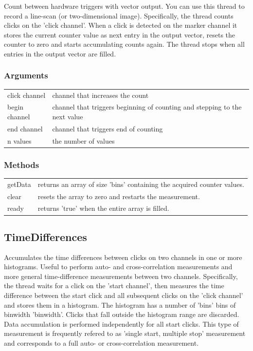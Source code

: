 \documentclass[oneside]{memoir}
\begin{document}
Count between hardware triggers with vector output. You can use this thread to record a line-scan (or
two-dimensional image). Specifically, the thread counts clicks on the 'click channel'. When a click
is detected on the marker channel it stores the current counter value as next entry in the output vector,
resets the counter to zero and starts accumulating counts again. The thread stops when all
entries in the output vector are filled.
\subsubsection{Arguments}
\begin{tabular}{p{}p{}}
  click channel & channel that increases the count\\
  begin channel & channel that triggers beginning of counting and stepping to the next value\\
  end channel & channel that triggers end of counting\\
  n values & the number of values\\
\end{tabular}
\subsubsection{Methods}
\begin{tabular}{p{}p{}}
  getData & returns an array of size 'bins' containing the acquired counter values.\\
  clear & resets the array to zero and restarts the measurement.\\
  ready & returns 'true' when the entire array is filled.\\
\end{tabular}

\subsection{TimeDifferences}

Accumulates the time differences between clicks on two channels in one or more histograms.
Useful to perform auto- and cross-correlation measurements and more general
time-difference measurements between two channels.
Specifically, the thread waits for a click on the 'start channel', then measures the
time difference between the start click and all subsequent clicks on the 'click channel'
and stores them in a histogram. The histogram has a number of 'bins'
bins of binwidth 'binwidth'. Clicks that fall outside the histogram range are discarded.
Data accumulation is performed independently for all start clicks. This type of measurement is frequently refered to as
'single start, multiple stop' measurement and corresponds to a full auto- or cross-correlation measurement.
\end{document}
